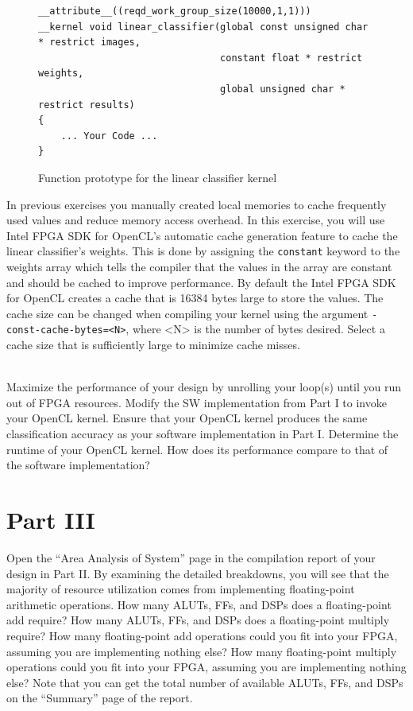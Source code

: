\documentclass[epsfig,10pt,fullpage]{article}
\begin{document}
\lstset{}
\begin{figure}[H]
\begin{center}
\begin{minipage}[t]{16 cm}
\vspace{-0.13in}\begin{lstlisting}
__attribute__((reqd_work_group_size(10000,1,1)))
__kernel void linear_classifier(global const unsigned char * restrict images, 
								constant float * restrict weights,
								global unsigned char * restrict results)
{
	... Your Code ...
}
\end{lstlisting}
\end{minipage}
\end{center}
\vspace{-0.33in}\caption{Function prototype for the linear classifier kernel}
\label{fig:kernel_v1}
\end{figure}

In previous exercises you manually created local memories to cache frequently used values and reduce memory access overhead.
In this exercise, you will use Intel FPGA SDK for OpenCL's automatic cache generation feature to cache the linear classifier's weights. 
This is done by assigning the \texttt{constant} 
keyword to the weights array which tells the compiler that the values in the array are constant and should be cached to improve performance.
By default the Intel FPGA SDK for OpenCL creates a cache that is 16384 bytes large to store the values. 
The cache size can be changed when compiling your kernel
using the argument \texttt{-const-cache-bytes=<N>}, where <N> is the number of bytes desired. 
Select a cache size that is sufficiently large to minimize cache misses.

~\\
Maximize the performance of your design by unrolling your loop(s) until you run out of FPGA resources.
Modify the SW implementation from Part I to invoke your OpenCL kernel. 
Ensure that your OpenCL kernel produces the same classification accuracy as your software implementation in Part I. 
Determine the runtime of your OpenCL kernel. How does its performance compare to that of the software implementation?

\section*{Part III}

Open the ``Area Analysis of System'' page in the compilation report of your design in Part II. By examining the detailed breakdowns, 
you will see that the majority of resource utilization comes from implementing floating-point arithmetic operations. 
How many ALUTs, FFs, and DSPs does a floating-point add require? How many ALUTs, FFs, and DSPs does a floating-point multiply require?
How many floating-point add operations could you fit into your FPGA, assuming you are implementing nothing else? 
How many floating-point multiply operations could you fit into your FPGA, assuming you are implementing nothing else?
Note that you can get the total number of available ALUTs, FFs, and DSPs on the ``Summary'' page of the report. 
\end{document}
